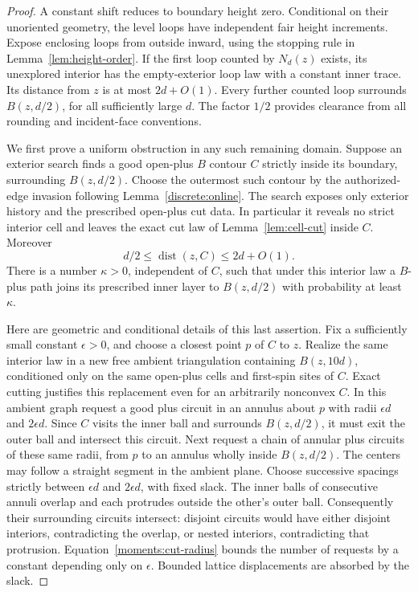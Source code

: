 \documentclass[11pt]{article}
\DeclareMathOperator{\dist}{dist}
\theoremstyle{definition}
\theoremstyle{remark}
\numberwithin{equation}{section}
\begin{document}
\begin{proof}
A constant shift reduces to boundary height zero.  Conditional on their
unoriented geometry, the level loops have independent fair height
increments.  Expose enclosing loops from outside inward, using the
stopping rule in Lemma~\ref{lem:height-order}.  If the first loop counted
by $N_d(z)$ exists, its unexplored interior has the empty-exterior loop
law with a constant inner trace.  Its distance from $z$ is at most
$2d+O(1)$.  Every further counted loop surrounds $B(z,d/2)$, for all
sufficiently large $d$.  The factor $1/2$ provides clearance from all
rounding and incident-face conventions.

We first prove a uniform obstruction in any such remaining domain.
Suppose an exterior search finds a good open-plus $B$ contour $C$ strictly
inside its boundary, surrounding $B(z,d/2)$.  Choose the outermost such
contour by the authorized-edge invasion following
Lemma~\ref{discrete:online}.  The search exposes only exterior
history and the prescribed open-plus cut data.  In particular it reveals
no strict interior cell and leaves the exact cut law of
Lemma~\ref{lem:cell-cut} inside $C$.  Moreover
\begin{equation}\label{moments:cut-radius}
 d/2\leq\dist(z,C)\leq2d+O(1).
\end{equation}
There is a number $\kappa>0$, independent of $C$, such that under this
interior law a $B$-plus path joins its prescribed inner layer to
$B(z,d/2)$ with probability at least $\kappa$.

Here are geometric and conditional details of this last assertion.
Fix a sufficiently small constant $\epsilon>0$, and choose a closest
point $p$ of $C$ to $z$.  Realize the same interior law in a new free
ambient triangulation containing $B(z,10d)$, conditioned only on the
same open-plus cells and first-spin sites of $C$.  Exact cutting
justifies this replacement even for an arbitrarily nonconvex $C$.
In this ambient graph request a good plus circuit in an annulus about
$p$ with radii $\epsilon d$ and $2\epsilon d$.  Since $C$ visits the
inner ball and surrounds $B(z,d/2)$, it must exit the outer ball and
intersect this circuit.  Next request a chain of annular plus circuits
of these same radii, from $p$ to an annulus wholly inside $B(z,d/2)$.
The centers may follow a straight segment in the ambient plane.  Choose
successive spacings strictly between $\epsilon d$ and $2\epsilon d$,
with fixed slack.  The inner balls of consecutive annuli overlap and
each protrudes outside the other's outer ball.  Consequently their
surrounding circuits intersect: disjoint circuits would have either
disjoint interiors, contradicting the overlap, or nested interiors,
contradicting that protrusion.  Equation~\eqref{moments:cut-radius}
bounds the number of requests by a constant depending only on
$\epsilon$.  Bounded lattice displacements are absorbed by the slack.


\end{proof}
\end{document}
